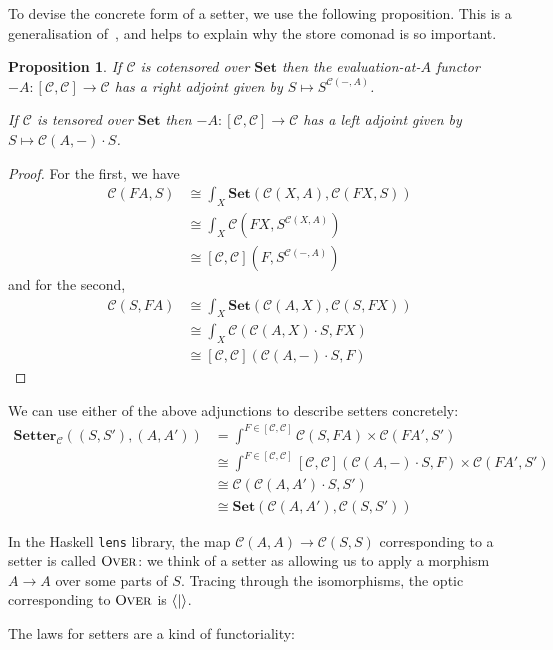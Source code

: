 \documentclass[11pt,letterpaper]{article}
\theoremstyle{plain}
\newtheorem{proposition}[theorem]{Proposition}
\theoremstyle{definition}
\newcommand{\C}{\mathscr{C}}
\newcommand{\lenslib}{\texttt{lens}}
\newcommand{\Set}{\mathbf{Set}}
\newcommand{\Setter}{\mathbf{Setter}}
\newcommand{\rep}[2]{{\ensuremath \left\langle #1 \mid #2 \right\rangle}}
\newcommand{\fover}{\textsc{Over}}
\begin{document}
To devise the concrete form of a setter, we use the following proposition. This is a generalisation of~\cite[Proposition 2.2]{SecondOrderFunctionals}, and helps to explain why the store comonad is so important.

\begin{proposition}
If $\C$ is cotensored over $\Set$ then the evaluation-at-$A$ functor $-A : [\C, \C] \to \C$ has a right adjoint given by $S \mapsto S^{\C(-, A)}$.

If $\C$ is tensored over $\Set$ then $-A : [\C, \C] \to \C$ has a left adjoint given by $S \mapsto \C(A, -) \cdot S$.
\end{proposition}
\begin{proof}
For the first, we have
\begin{align*}
\C(FA, S)
&\cong \int_X \Set(\C(X, A), \C(FX, S)) \\
&\cong \int_X \C(FX, S^{\C(X, A)}) \\
&\cong [\C, \C](F, S^{\C(-, A)})
\end{align*}
and for the second,
\begin{align*}
\C(S, FA)
&\cong \int_X \Set(\C(A, X), \C(S, FX)) \\
&\cong \int_X \C(\C(A, X) \cdot S, FX) \\
&\cong [\C, \C](\C(A, -) \cdot S, F)
\end{align*}
\end{proof}

We can use either of the above adjunctions to describe setters concretely:
\begin{align*}
  \Setter_\C((S, S'), (A, A')) &= \int^{F \in [\C, \C]} \C(S, FA) \times \C(FA', S') \\
                               &\cong \int^{F \in [\C, \C]} [\C, \C](\C(A, -) \cdot S, F) \times \C(FA', S') \\
                               &\cong \C(\C(A, A') \cdot S, S') \\
                               &\cong \Set(\C(A, A'), \C(S, S'))
\end{align*}

In the Haskell \lenslib{} library, the map $\C(A, A) \to \C(S,S)$ corresponding to a setter is called $\fover$: we think of a setter as allowing us to apply a morphism $A \to A$ over some parts of $S$. Tracing through the isomorphisms, the optic corresponding to $\fover$ is $\rep{}{}$.

The laws for setters are a kind of functoriality:
\end{document}
